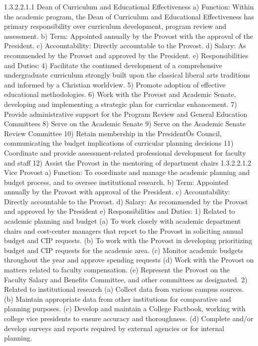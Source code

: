 \documentclass[letterpaper, 11pt]{article}
\begin{document}
1.3.2.2.1.1 Dean of Curriculum and Educational Effectiveness
a) Function:  Within the academic program, the Dean of Curriculum and Educational Effectiveness has primary responsibility over curriculum development, program review and assessment.
b) Term:  Appointed annually by the Provost with the approval of the President.
c) Accountability:  Directly accountable to the Provost.
d) Salary:  As recommended by the Provost and approved by the President.
e) Responsibilities and Duties:
4) Facilitate the continued development of a comprehensive undergraduate curriculum strongly built upon the classical liberal arts traditions and informed by a Christian worldview.
5) Promote adoption of effective educational methodologies.
6) Work with the Provost and Academic Senate, developing and implementing a strategic plan for curricular enhancement.
7) Provide administrative support for the Program Review and General Education Committees
8) Serve on the Academic Senate
9) Serve on the Academic Senate Review Committee
10) Retain membership in the PresidentÕs Council, communicating the budget implications of curricular planning decisions
11) Coordinate and provide assessment-related professional development for faculty and staff
12) Assist the Provost in the mentoring of department chairs
1.3.2.2.1.2 	Vice Provost
a) Function:  To coordinate and manage the academic planning and budget process, and to oversee institutional research.
b) Term:  Appointed annually by the Provost with approval of the President.
c) Accountability:  Directly accountable to the Provost.
d) Salary:  As recommended by the Provost and approved by the President
e) Responsibilities and Duties:
1) Related to academic planning and budget
(a) To work closely with academic department chairs and cost-center managers that report to the Provost in soliciting annual budget and CIP requests.
(b) To work with the Provost in developing prioritizing budget and CIP requests for the academic area.
(c) Monitor academic budgets throughout the year and approve spending requests
(d) Work with the Provost on matters related to faculty compensation.
(e) Represent the Provost on the Faculty Salary and Benefits Committee, and other committees as designated.
2) Related to institutional research
(a) Collect data from various campus sources.
(b) Maintain appropriate data from other institutions for comparative and planning purposes.
(c) Develop and maintain a College Factbook, working with college vice presidents to ensure accuracy and thoroughness.
(d) Complete and/or develop surveys and reports required by external agencies or for internal planning.
\end{document}

